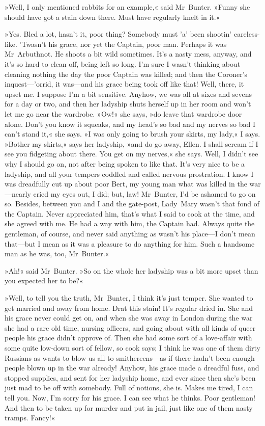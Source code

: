 »Well, I only mentioned rabbits for an example,« said Mr~Bunter.  »Funny she should have got a stain down there. Must have regularly knelt in it.«

»Yes. Bled a lot, hasn't it, poor thing? Somebody must 'a' been shootin' careless-like. 'Twasn't his grace, nor yet the Captain, poor man. Perhaps it was Mr~Arbuthnot. He shoots a bit wild sometimes.  It's a nasty mess, anyway, and it's so hard to clean off, being left so long. I'm sure I wasn't thinking about cleaning nothing the day the poor Captain was killed; and then the Coroner's inquest—'orrid, it was—and his grace being took off like that! Well, there, it upset me.  I suppose I'm a bit sensitive. Anyhow, we was all at sixes and sevens for a day or two, and then her ladyship shuts herself up in her room and won't let me go near the wardrobe. »Ow!« she says, »do leave that wardrobe door alone. Don't you know it squeaks, and my head's so bad and my nerves so bad I can't stand it,« she says. »I was only going to brush your skirts, my lady,« I says. »Bother my skirts,« says her ladyship, »and do go away, Ellen. I shall scream if I see you fidgeting about there. You get on my nerves,« she says. Well, I didn't see why I should go on, not after being spoken to like that. It's very nice to be a ladyship, and all your tempers coddled and called nervous prostration. I know I was dreadfully cut up about poor Bert, my young man what was killed in the war—nearly cried my eyes out, I did; but, law! Mr~Bunter, I'd be ashamed to go on so. Besides, between you and I and the gate-post, Lady~Mary wasn't that fond of the Captain. Never appreciated him, that's what I said to cook at the time, and she agreed with me. He had a way with him, the Captain had. Always quite the gentleman, of course, and never said anything as wasn't his place—I don't mean that—but I mean as it was a pleasure to do anything for him. Such a handsome man as he was, too, Mr~Bunter.«

»Ah!« said Mr~Bunter. »So on the whole her ladyship was a bit more upset than you expected her to be?«

»Well, to tell you the truth, Mr~Bunter, I think it's just temper. She wanted to get married and away from home. Drat this stain! It's regular dried in. She and his grace never could get on, and when she was away in London during the war she had a rare old time, nursing officers, and going about with all kinds of queer people his grace didn't approve of.  Then she had some sort of a love-affair with some quite low-down sort of fellow, so cook says; I think he was one of them dirty Russians as wants to blow us all to smithereens—as if there hadn't been enough people blown up in the war already! Anyhow, his grace made a dreadful fuss, and stopped supplies, and sent for her ladyship home, and ever since then she's been just mad to be off with somebody. Full of notions, she is. Makes me tired, I can tell you. Now, I'm sorry for his grace. I can see what he thinks. Poor gentleman! And then to be taken up for murder and put in jail, just like one of them nasty tramps.  Fancy!«

